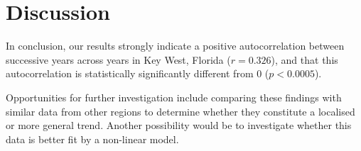 \documentclass[12pt]{article}
\begin{document}
	\section{Discussion}
	In conclusion, our results strongly indicate a positive autocorrelation between successive years across years in Key West, Florida ($r=0.326$), and that this autocorrelation is statistically significantly different from 0 ($p < 0.0005$).
	
	Opportunities for further investigation include comparing these findings with similar data from other regions to determine whether they constitute a localised or more general trend. Another possibility would be to investigate whether this data is better fit by a non-linear model.
\end{document}
